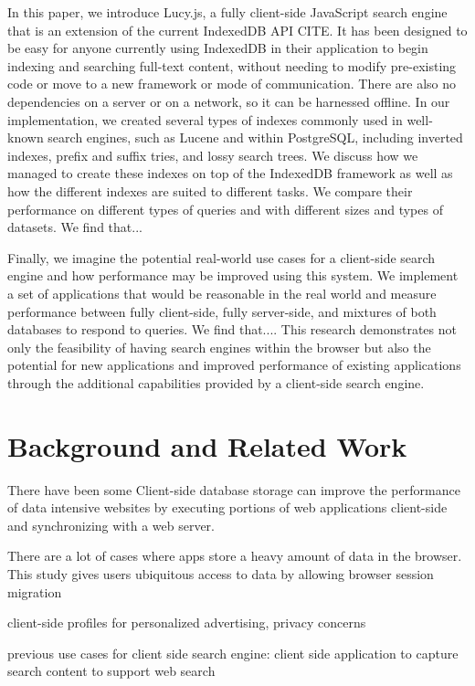 \documentclass{vldb}
\begin{document}
In this paper, we introduce Lucy.js, a fully client-side JavaScript search engine that is an extension of the current IndexedDB API CITE. It has been designed to be easy for anyone currently using IndexedDB in their application to begin indexing and searching full-text content, without needing to modify pre-existing code or move to a new framework or mode of communication. There are also no dependencies on a server or on a network, so it can be harnessed offline. In our implementation, we created several types of indexes commonly used in well-known search engines, such as Lucene and within PostgreSQL, including inverted indexes, prefix and suffix tries, and lossy search trees. We discuss how we managed to create these indexes on top of the IndexedDB framework as well as how the different indexes are suited to different tasks. We compare their performance on different types of queries and with different sizes and types of datasets. We find that...


Finally, we imagine the potential real-world use cases for a client-side search engine and how performance may be improved using this system. We implement a set of applications that would be reasonable in the real world and measure performance between fully client-side, fully server-side, and mixtures of both databases to respond to queries. We find that....
This research demonstrates not only the feasibility of having search engines within the browser but also the potential for new applications and improved performance of existing applications through the additional capabilities provided by a client-side search engine.


\section{Background and Related Work}

There have been some 
Client-side database storage can improve the performance of data intensive websites by executing portions of web applications client-side and synchronizing with a web server.
\cite{benson2010sync}

There are a lot of cases where apps store a heavy amount of data in the browser. This study gives users ubiquitous access to data by allowing browser session migration \cite{lo2013imagen}

client-side profiles for personalized advertising, privacy concerns \cite{bilenko2011predictive}



previous use cases for client side search engine:
client side application to capture search content to support web search
\cite{bharat2000searchpad}
\end{document}
